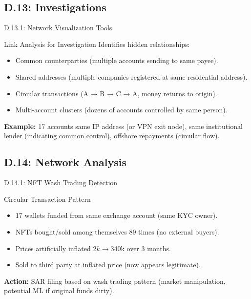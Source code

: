 \documentclass{beamer}
\begin{document}
	\subsection{D.13: Investigations}
	
	\begin{frame}{D.13.1: Network Visualization Tools}
		\begin{block}{Link Analysis for Investigation}
			Identifies hidden relationships:
			\begin{itemize}
				\item Common counterparties (multiple accounts sending to same payee).
				\item Shared addresses (multiple companies registered at same residential address).
				\item Circular transactions (A → B → C → A, money returns to origin).
				\item Multi-account clusters (dozens of accounts controlled by same person).
			\end{itemize}
		\end{block}
		\textbf{Example:} 17 accounts same IP address (or VPN exit node), same institutional lender (indicating common control), offshore repayments (circular flow).
	\end{frame}
	
	\subsection{D.14: Network Analysis}
	
	\begin{frame}{D.14.1: NFT Wash Trading Detection}
		\begin{block}{Circular Transaction Pattern}
			\begin{itemize}
				\item 17 wallets funded from same exchange account (same KYC owner).
				\item NFTs bought/sold among themselves 89 times (no external buyers).
				\item Prices artificially inflated $2k → $340k over 3 months.
				\item Sold to third party at inflated price (now appears legitimate).
			\end{itemize}
		\end{block}
		\textbf{Action:} SAR filing based on wash trading pattern (market manipulation, potential ML if original funds dirty).
	\end{frame}
	
\end{document}
